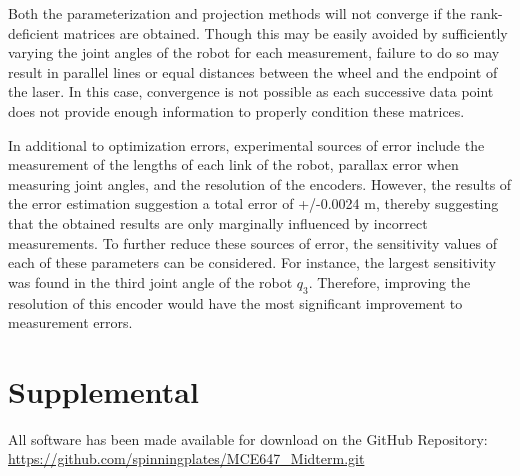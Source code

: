 \documentclass[12pt]{article}
\begin{document}
Both the parameterization and projection methods will not converge if the rank-deficient matrices are obtained.  Though this may be easily avoided by sufficiently varying the joint angles of the robot for each measurement, failure to do so may result in parallel lines or equal distances between the wheel and the endpoint of the laser. In this case, convergence is not possible as each successive data point does not provide enough information to properly condition these matrices.  

In additional to optimization errors, experimental sources of error include the measurement of the lengths of each link of the robot, parallax error when measuring joint angles, and the resolution of the encoders. However, the results of the error estimation suggestion a total error of +/-0.0024 m, thereby suggesting that the obtained results are only marginally influenced by incorrect measurements. To further reduce these sources of error, the sensitivity values of each of these parameters can be considered.  For instance, the largest sensitivity was found in the third joint angle of the robot $q_3$. Therefore, improving the resolution of this encoder would have the most significant improvement to measurement errors. 

\section*{Supplemental} 

All software has been made available for download on the GitHub Repository:
\url{https://github.com/spinningplates/MCE647_Midterm.git}
\end{document}
